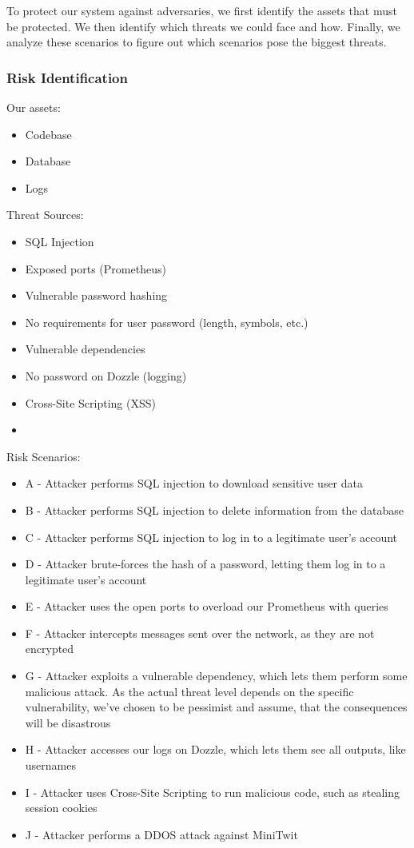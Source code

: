 To protect our system against adversaries, we first identify the assets that must be protected. We then identify which threats we could face and how. Finally, we analyze these scenarios to figure out which scenarios pose the biggest threats.

\subsubsection{Risk Identification}
Our assets:
\begin{itemize}
    \item Codebase
    \item Database
    \item Logs
\end{itemize}

Threat Sources:
\begin{itemize}
    \item SQL Injection
    \item Exposed ports (Prometheus)
    \item Vulnerable password hashing
    \item No requirements for user password (length, symbols, etc.)
    \item Vulnerable dependencies
    \item No password on Dozzle (logging)
    \item Cross-Site Scripting (XSS)
    \item 
\end{itemize}

Risk Scenarios:
\begin{itemize}
    \item A - Attacker performs SQL injection to download sensitive user data
    \item B - Attacker performs SQL injection to delete information from the database
    \item C - Attacker performs SQL injection to log in to a legitimate user's account
    \item D - Attacker brute-forces the hash of a password, letting them log in to a legitimate user's account
    \item E - Attacker uses the open ports to overload our Prometheus with queries
    \item F - Attacker intercepts messages sent over the network, as they are not encrypted
    \item G - Attacker exploits a vulnerable dependency, which lets them perform some malicious attack. As the actual threat level depends on the specific vulnerability, we've chosen to be pessimist and assume, that the consequences will be disastrous
    \item H - Attacker accesses our logs on Dozzle, which lets them see all outputs, like usernames
    \item I - Attacker uses Cross-Site Scripting to run malicious code, such as stealing session cookies
    \item J - Attacker performs a DDOS attack against MiniTwit
\end{itemize}

